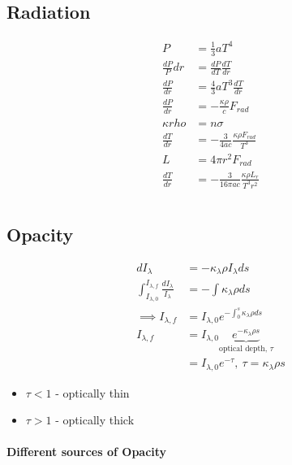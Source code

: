 \documentclass[a4paper,11pt,normalem]{article}
\begin{document}
\subsection{Radiation}

\begin{align*}
    P &= \frac{1}{3}a T^4 \\
    \frac{dP}P{dr} &= \frac{dP}{dT}\frac{dT}{dr} \\
    \frac{dP}{dr} &= \frac{4}{3}a T^3 \frac{dT}{dr} \\
    \frac{dP}{dr} &= -\frac{\kappa\rho}{c}F_{rad} \\
    \kappa rho &= n\sigma \\
    \frac{dT}{dr} &= -\frac{3}{4ac}\frac{\kappa\rho F_{rad}}{T^3} \\
    L &= 4\pi r^2 F_{rad} \\
    \frac{dT}{dr} &= -\frac{3}{16\pi ac}\frac{\kappa\rho L_r}{T^3 r^2}
\end{align*}

\section{}

\subsection{Opacity}

\begin{align*}
    dI_\lambda &= - \kappa_\lambda \rho I_{\lambda} ds \\
    \int_{I_{\lambda, 0}}^{I_{\lambda, f}} \frac{dI_{\lambda}}{I_{\lambda}} &= - \int \kappa_{\lambda} \rho ds \\
    \implies I_{\lambda, f} &= I_{\lambda, 0}e^{-\int_0^s \kappa_{\lambda}\rho ds} \\
    I_{\lambda, f} &= I_{\lambda, 0}\underbrace{e^{-\kappa_\lambda \rho s}}_{\text{optical depth, }\tau} \\
    &= I_{\lambda, 0}e^{-\tau}, ~ \tau = \kappa_{\lambda}\rho s
\end{align*}

\begin{itemize}
    \item \(\tau < 1\) - optically thin
    \item \(\tau > 1\) - optically thick
\end{itemize}

\paragraph{Different sources of Opacity}
\end{document}
